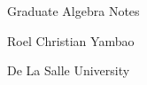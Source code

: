 \thispagestyle{empty}

\vspace*{1.5in}


{
    \LARGE
\noindent Graduate Algebra Notes
}

\vspace{\fill}


\noindent Roel Christian Yambao

\noindent De La Salle University


\vspace*{0.5in}

\cleardoublepage
